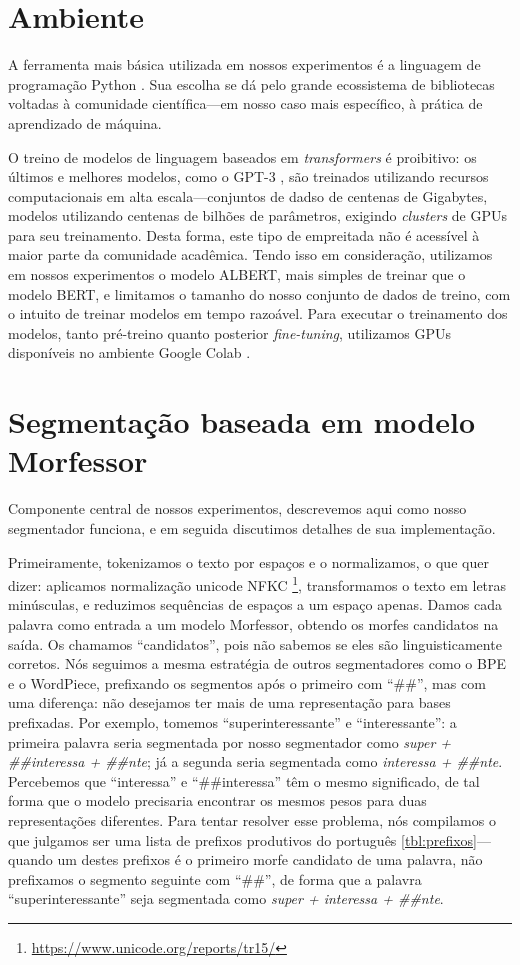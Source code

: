 \documentclass[cic,tc]{iiufrgs}
\begin{document}
\section{Ambiente}
A ferramenta mais básica utilizada em nossos experimentos é a linguagem de programação Python \cite{VanRossum2009}. Sua escolha se dá pelo grande ecossistema de bibliotecas voltadas à comunidade científica---em nosso caso mais específico, à prática de aprendizado de máquina.

O treino de modelos de linguagem baseados em \emph{transformers} é proibitivo: os últimos e melhores modelos, como o GPT-3 \cite{brown2020}, são treinados utilizando recursos computacionais em alta escala---conjuntos de dadso de centenas de Gigabytes, modelos utilizando centenas de bilhões de parâmetros, exigindo \emph{clusters} de GPUs para seu treinamento. Desta forma, este tipo de empreitada não é acessível à maior parte da comunidade acadêmica. Tendo isso em consideração, utilizamos em nossos experimentos o modelo ALBERT, mais simples de treinar que o modelo BERT, e limitamos o tamanho do nosso conjunto de dados de treino, com o intuito de treinar modelos em tempo razoável. Para executar o treinamento dos modelos, tanto pré-treino quanto posterior \emph{fine-tuning}, utilizamos GPUs disponíveis no ambiente Google Colab \cite{Bisong2019}.

\section{Segmentação baseada em modelo Morfessor}\label{custom-tokenizer}
Componente central de nossos experimentos, descrevemos aqui como nosso segmentador funciona, e em seguida discutimos detalhes de sua implementação.

Primeiramente, tokenizamos o texto por espaços e o normalizamos, o que quer dizer: aplicamos normalização unicode NFKC \footnote{\url{https://www.unicode.org/reports/tr15/}}, transformamos o texto em letras minúsculas, e reduzimos sequências de espaços a um espaço apenas. Damos cada palavra como entrada a um modelo Morfessor, obtendo os morfes candidatos na saída. Os chamamos ``candidatos'', pois não sabemos se eles são linguisticamente corretos. Nós seguimos a mesma estratégia de outros segmentadores como o BPE e o WordPiece, prefixando os segmentos após o primeiro com ``\#\#'', mas com uma diferença: não desejamos ter mais de uma representação para bases prefixadas. Por exemplo, tomemos ``superinteressante'' e ``interessante'': a primeira palavra seria segmentada por nosso segmentador como \emph{super + \#\#interessa + \#\#nte}; já a segunda seria segmentada como \emph{interessa + \#\#nte}. Percebemos que ``interessa'' e ``\#\#interessa'' têm o mesmo significado, de tal forma que o modelo precisaria encontrar os mesmos pesos para duas representações diferentes. Para tentar resolver esse problema, nós compilamos o que julgamos ser uma lista de prefixos produtivos do português \ref{tbl:prefixos}---quando um destes prefixos é o primeiro morfe candidato de uma palavra, não prefixamos o segmento seguinte com ``\#\#'', de forma que a palavra ``superinteressante'' seja segmentada como \emph{super + interessa + \#\#nte}.
\end{document}
